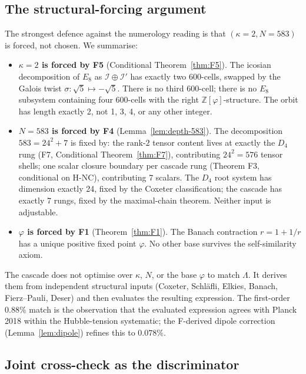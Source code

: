 \documentclass[11pt]{article}
\theoremstyle{plain}
\theoremstyle{definition}
\theoremstyle{remark}
\newcommand{\Zphi}{\mathbb{Z}[\varphi]}
\newcommand{\Ical}{\mathcal{I}}
\begin{document}
\subsection{The structural-forcing argument}\label{sec:uniqueness-forcing}

The strongest defence against the numerology reading is that $(\kappa = 2, N = 583)$ is forced, not chosen. We summarise:

\begin{itemize}[leftmargin=2em]
\item \textbf{$\kappa = 2$ is forced by F5} (Conditional Theorem~\ref{thm:F5}). The icosian decomposition of $E_8$ as $\Ical \oplus \Ical'$ has exactly two 600-cells, swapped by the Galois twist $\sigma: \sqrt 5 \mapsto -\sqrt 5$. There is no third 600-cell; there is no $E_8$ subsystem containing four 600-cells with the right $\Zphi$-structure. The orbit has length exactly 2, not 1, 3, 4, or any other integer.
\item \textbf{$N = 583$ is forced by F4} (Lemma~\ref{lem:depth-583}). The decomposition $583 = 24^2 + 7$ is fixed by: the rank-$2$ tensor content lives at exactly the $D_4$ rung (F7, Conditional Theorem~\ref{thm:F7}), contributing $24^2 = 576$ tensor shells; one scalar closure boundary per cascade rung (Theorem F3, conditional on H-NC), contributing 7 scalars. The $D_4$ root system has dimension exactly 24, fixed by the Coxeter classification; the cascade has exactly 7 rungs, fixed by the maximal-chain theorem. Neither input is adjustable.
\item \textbf{$\varphi$ is forced by F1} (Theorem~\ref{thm:F1}). The Banach contraction $r = 1 + 1/r$ has a unique positive fixed point $\varphi$. No other base survives the self-similarity axiom.
\end{itemize}

The cascade does not optimise over $\kappa$, $N$, or the base $\varphi$ to match $\Lambda$. It derives them from independent structural inputs (Coxeter, Schl\"afli, Elkies, Banach, Fierz--Pauli, Deser) and then evaluates the resulting expression. The first-order $0.88\%$ match is the observation that the evaluated expression agrees with Planck 2018 within the Hubble-tension systematic; the F-derived dipole correction (Lemma~\ref{lem:dipole}) refines this to $0.078\%$.

\subsection{Joint cross-check as the discriminator}\label{sec:uniqueness-joint}
\end{document}
